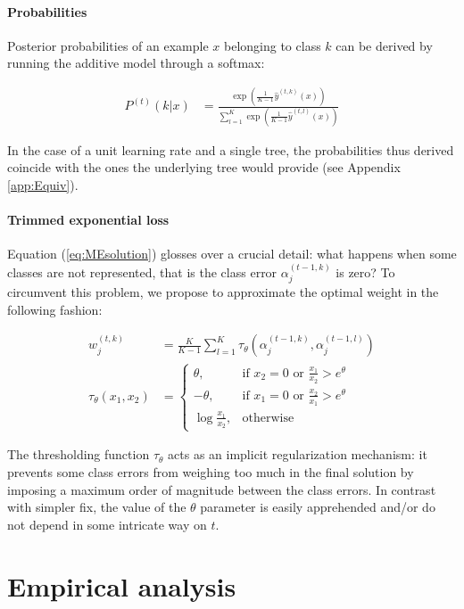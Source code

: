 \documentclass{article}
\begin{document}
\paragraph{Probabilities}
Posterior probabilities of an example $x$ belonging to class $k$ can be derived 
by running the additive model through a softmax:

\begin{align}\label{eq:MEproba}
P^{(t)}(k|x) &= \frac{\exp \left(\frac{1}{K-1} \hat{y}^{(t, k)}(x) 
\right)}{\sum_{l=1}^K\exp \left(\frac{1}{K-1} \hat{y}^{(t, l)}(x) \right)}
\end{align}

In the case of a unit learning rate and a single tree, the probabilities thus 
derived coincide with the ones the underlying tree would provide (see Appendix 
\ref{app:Equiv}).


\paragraph{Trimmed exponential loss}
Equation (\ref{eq:MEsolution}) glosses over a crucial detail: what happens when 
some classes are not represented, that is the class error $\alpha_j^{(t-1, k)}$ 
is zero? To circumvent this problem, we propose to approximate the optimal 
weight in the following fashion:

\begin{align}\label{eq:METrimmed}
w_j^{(t,k)} &= \frac{K}{K-1} \sum_{l=1}^{K} \tau_{\theta} \left(\alpha_j^{(t-1, 
k)},  \alpha_j^{(t-1, l)}\right)\\
\tau_{\theta}(x_1, x_2) &=\begin{cases}
    \theta, & \text{if $x_2 = 0$ or $\frac{x_1}{x_2} > e^{\theta}$}\\
    -\theta,& \text{if $x_1 = 0$ or $\frac{x_2}{x_1} > e^{\theta}$}\\
    \log \frac{x_1}{x_2}, & \text{otherwise}
  \end{cases}
\end{align}

The thresholding function $\tau_{\theta}$ acts as an implicit regularization 
mechanism: it prevents some class errors from weighing too much in the final 
solution by imposing a maximum order of magnitude between the class errors. In 
contrast with simpler fix, the value of the  $\theta$ parameter is easily 
apprehended and/or do not depend in some intricate way on $t$.




\section{Empirical analysis}
\end{document}

